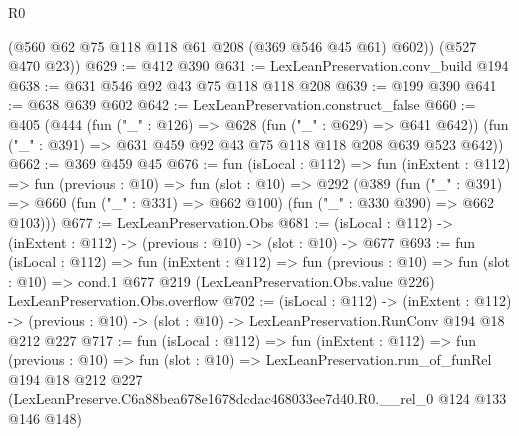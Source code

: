 \begin{lexlean}{R0}
\begin{coremodule}
        (@560 @62 @75 @118 @118 @61 @208 (@369 @546 @45 @61) @602))
      (@527 @470 @23))
@629 := @412 @390
@631 := LexLeanPreservation.conv_build @194
@638 := @631 @546 @92 @43 @75 @118 @118 @208
@639 := @199 @390
@641 := @638 @639 @602
@642 := LexLeanPreservation.construct_false
@660 := @405
    (@444
      (fun ("_" : @126) => @628 (fun ("_" : @629) => @641 @642))
      (fun ("_" : @391) => @631 @459 @92 @43 @75 @118 @118 @208 @639 @523 @642))
@662 := @369 @459 @45
@676 := fun (isLocal : @112) =>
  fun (inExtent : @112) =>
  fun (previous : @10) =>
  fun (slot : @10) =>
  @292
    (@389
      (fun ("_" : @391) =>
      @660 (fun ("_" : @331) => @662 @100) (fun ("_" : @330 @390) => @662 @103)))
@677 := LexLeanPreservation.Obs
@681 := (isLocal : @112) -> (inExtent : @112) -> (previous : @10) -> (slot : @10) -> @677
@693 := fun (isLocal : @112) =>
  fun (inExtent : @112) =>
  fun (previous : @10) =>
  fun (slot : @10) =>
  cond.{1} @677 @219 (LexLeanPreservation.Obs.value @226) LexLeanPreservation.Obs.overflow
@702 := (isLocal : @112) ->
  (inExtent : @112) ->
  (previous : @10) -> (slot : @10) -> LexLeanPreservation.RunConv @194 @18 @212 @227
@717 := fun (isLocal : @112) =>
  fun (inExtent : @112) =>
  fun (previous : @10) =>
  fun (slot : @10) =>
  LexLeanPreservation.run_of_funRel
    @194
    @18
    @212
    @227
    (LexLeanPreserve.C6a88bea678e1678dcdac468033ee7d40.R0.__rel_0 @124 @133 @146 @148)
\end{coremodule}
\end{lexlean}
